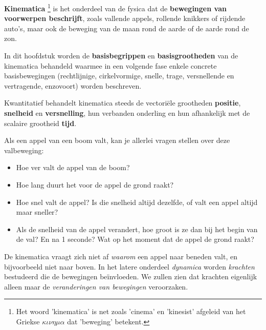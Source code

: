 \documentclass{ximera}
\begin{document}
	\author{Bart Lambregs, Vincent Gellens}
    \xmsource\xmuitleg

\textbf{Kinematica}
\footnote{Het woord 'kinematica' is net zoals 'cinema' en 'kinesist' afgeleid van het Griekse $\kappa \iota \nu \eta \mu \alpha$ dat 'beweging' betekent.} 
is het onderdeel van de fysica dat de \textbf{bewegingen van voorwerpen beschrijft}, 
zoals vallende appels, rollende knikkers of rijdende auto's, maar ook de beweging van de maan rond de aarde of de aarde rond de zon. 




In dit hoofdstuk worden de \textbf{basisbegrippen} en \textbf{basisgrootheden} van de kinematica behandeld waarmee in een volgende fase enkele concrete basisbewegingen (rechtlijnige, cirkelvormige, snelle, trage, versnellende en vertragende, enzovoort) worden beschreven.

Kwantitatief behandelt kinematica steeds de vectoriële grootheden \textbf{positie}, \textbf{snelheid} en \textbf{versnelling}, hun verbanden onderling en hun afhankelijk met de scalaire grootheid \textbf{tijd}.

\begin{example}
Als een appel van een boom valt, kan je allerlei vragen stellen over deze valbeweging: 

\begin{itemize}
	\item Hoe ver valt de appel van de boom?
	\item Hoe lang duurt het voor de appel de grond raakt? 
	\item Hoe snel valt de appel? Is die snelheid altijd dezelfde, of valt een appel altijd maar sneller? 
	\item Als de snelheid van de appel verandert, hoe groot is ze dan bij het begin van de val? En na 1 seconde? Wat op het moment dat de appel de grond raakt? 
\end{itemize}

De kinematica vraagt zich niet af \textit{waarom} een appel naar beneden valt, en bijvoorbeeld niet naar boven.
In het latere onderdeel \textit{dynamica} worden \textit{krachten} bestudeerd die de bewegingen beïnvloeden. 
We zullen zien dat krachten eigenlijk alleen maar de \textit{veranderingen van bewegingen} veroorzaken.

\end{example}
\end{document}
